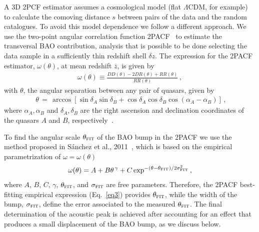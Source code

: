 \documentclass[a4paper,11pt]{article}
\begin{document}
A 3D 2PCF estimator assumes a cosmological model (flat $\Lambda$CDM, for example) to calculate 
the comoving distance $s$ between pairs of the data and the random catalogues. 
To avoid this model dependence we follow a different approach. 
We use the two-point angular correlation function 2PACF~\cite{PeeblesYu} to estimate the transversal 
BAO contribution, analysis that is possible to be done selecting the data sample in a sufficiently thin 
redshift shell $\delta z$. 
The expression for the 2PACF estimator, $\omega(\theta)$, at mean redshift $\overline{z}$, is given by
\begin{eqnarray}\label{2PACF}
\omega(\theta) \equiv \frac{DD(\theta)-2DR(\theta)+RR(\theta)}{RR(\theta)} \, ,
\label{eq2}
\end{eqnarray}
with $\theta$, the angular separation between any pair of quasars, given by 
\begin{eqnarray}	
\,\,\theta\,=\,\arccos[\sin{\delta_{A}}\sin{\delta_{B}}+
\cos{\delta_{A}}\cos{\delta_{B}}\cos(\alpha_{A}-\alpha_{B})] \, , \nonumber
\end{eqnarray}
where $\alpha_{A}, \alpha_{B}$ and $\delta_{A}, \delta_{B}$ are the right ascension and declination 
coordinates of the quasars $A$ and $B$, respectively~\cite{Landy-Szalay,Sanchez11,Crocce11a}. 

To find the angular scale $\theta_{\mbox{\footnotesize\sc fit}}$ of the BAO bump in the 2PACF 
we use the method proposed in S\'anchez et al., 2011~\cite{Sanchez11}, which is based on the 
empirical parametrization of $\omega = \omega(\theta)$ 
\begin{eqnarray}\label{ajuste}			    
\omega(\theta) = A + B\theta^{\,\gamma} + C\exp^{-(\theta-\theta_{\rm FIT}) / 2\sigma_{\rm FIT}^{2}} \, ,
\label{eq3}
\end{eqnarray}
where $A$, $B$, $C$, $\gamma$, $\theta_{\mbox{\footnotesize\sc fit}}$, and 
$\sigma_{\mbox{\footnotesize\sc fit}}$ are free parameters. 
Therefore, the 2PACF best-fitting empirical expression (Eq.~\ref{eq3}) provides 
$\theta_{\mbox{\footnotesize\sc fit}}$, while the width of the bump, 
$\sigma_{\mbox{\footnotesize\sc fit}}$, 
define the error associated to the measured $\theta_{\mbox{\footnotesize\sc fit}}$. 
The final determination of the acoustic peak is achieved after accounting for an effect that produces 
a small displacement of the BAO bump, as we discuss below. 
\end{document}
